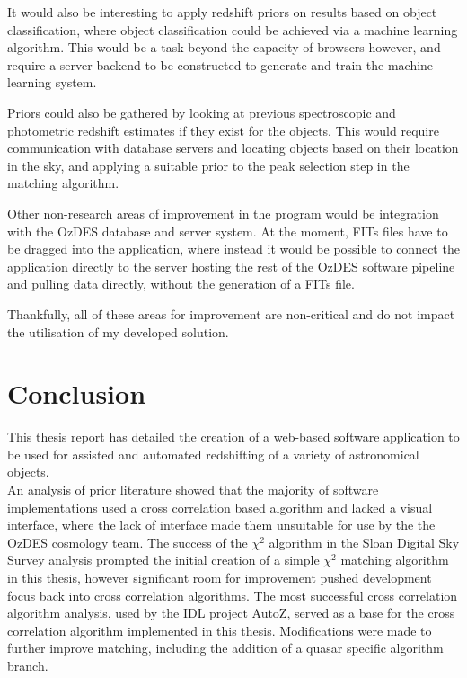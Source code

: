 \documentclass[titlesmallcaps, examinerscopy, copyrightpage]{uqthesis}
\begin{document}
It would also be interesting to apply redshift priors on results based on object classification, where object classification could be achieved via a machine learning algorithm. This would be a task beyond the capacity of browsers however, and require a server backend to be constructed to generate and train the machine learning system.

Priors could also be gathered by looking at previous spectroscopic and photometric redshift estimates if they exist for the objects. This would require communication with database servers and locating objects based on their location in the sky, and applying a suitable prior to the peak selection step in the matching algorithm.

Other non-research areas of improvement in the program would be integration with the OzDES database and server system. At the moment, FITs files have to be dragged into the application, where instead it would be possible to connect the application directly to the server hosting the rest of the OzDES software pipeline and pulling data directly, without the generation of a FITs file.

Thankfully, all of these areas for improvement are non-critical and do not impact the utilisation of my developed solution.







\chapter{Conclusion}

This thesis report has detailed the creation of a web-based software application to be used for assisted and automated redshifting of a variety of astronomical objects.\\

An analysis of prior literature showed that the majority of software implementations used a cross correlation based algorithm and lacked a visual interface, where the lack of interface made them unsuitable for use by the the OzDES cosmology team. The success of the $\chi^2$ algorithm in the Sloan Digital Sky Survey analysis prompted the initial creation of a simple $\chi^2$ matching algorithm in this thesis, however significant room for improvement pushed development focus back into cross correlation algorithms. The most successful cross correlation algorithm analysis, used by the IDL project AutoZ, served as a base for the cross correlation algorithm implemented in this thesis. Modifications were made to further improve matching, including the addition of a quasar specific algorithm branch.\\
\end{document}

